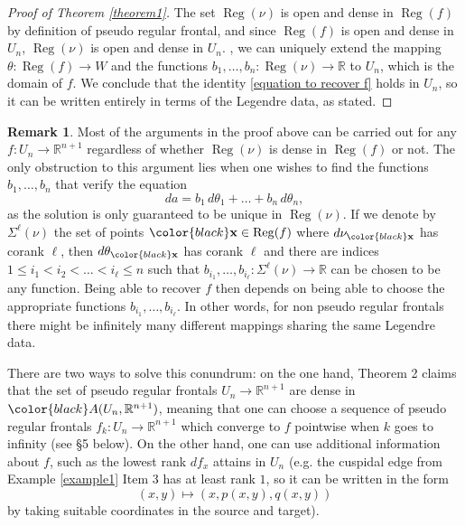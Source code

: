 \documentclass{amsart}
\theoremstyle{definition}
\theoremstyle{definition}
\theoremstyle{definition}
\newtheorem{remark}{Remark}
\newcommand{\mb}{\mathbb}
\DeclareMathOperator{\Reg}{Reg}
\newcommand{\ch}[1]{{\color{black} #1}}
\begin{document}
\begin{proof}[Proof of Theorem \ref{theorem1}]
	The set $\Reg(\nu)$ is \ch{open and} dense in $\Reg(f)$ by definition of pseudo regular frontal, and since $\Reg(f)$ is \ch{open and} dense in $U_n$, $\Reg(\nu)$ is \ch{open and} dense in $U_n$.
	, we can uniquely extend the mapping $\theta\colon \Reg(f) \to W$ and the functions $b_1,\dots,b_n\colon \Reg(\nu) \to \mb{R}$ to $U_n$, which is the domain of $f$.
	We conclude that the identity \eqref{equation to recover f} holds in $U_n$, so it can be written entirely in terms of the Legendre data, as stated.
\end{proof}

\begin{remark}
	Most of the arguments in the proof above can be carried out for any $f\colon U_n \to \mb{R}^{n+1}$ regardless of whether $\Reg(\nu)$ is dense in $\Reg(f)$ or not.
	The only obstruction to this argument lies when one wishes to find the functions $b_1,\dots,b_n$ that verify the equation
		\[da=b_1\,d\theta_1+\dots+b_n\,d\theta_n,\]
	as the solution is only guaranteed to be unique in $\Reg(\nu)$.
	If we denote by $\Sigma^\ell(\nu)$ 
	the set of points ${\color{black}\bf x}\in \Reg(f)$ 
	where $d\nu_{\color{black}\bf x}$ 
	has corank $\ell$, then $d\theta_{\color{black}\bf x}$ 
	has corank $\ell$ and there are indices $1 \leq i_1 < i_2 < \dots < i_\ell \leq n$ such that $b_{i_1}, \dots, b_{i_\ell}\colon \Sigma^\ell(\nu) \to \mb{R}$ can be chosen to be any function.
	 Being able to recover $f$ then depends on being able to choose the appropriate functions $b_{i_1}, \dots, b_{i_\ell}$. In other words, for non pseudo regular frontals there might be infinitely many different mappings sharing the same Legendre data.
	
	There are two ways to solve this conundrum: on the one hand, Theorem 2 claims that the set of pseudo regular frontals $U_n \to \mb{R}^{n+1}$ are dense in ${\color{black}A}(U_n,\mb{R}^{n+1})$, meaning that one can choose a sequence of pseudo regular frontals $f_k\colon U_n \to \mb{R}^{n+1}$ which converge to $f$ pointwise when $k$ goes to infinity (see \S 5 below).
	On the other hand, one can use additional information about $f$, such as the lowest rank $df_x$ attains in $U_n$ (e.g. the cuspidal edge from Example \ref{example1} Item 3 has at least rank $1$, so it can be written in the form
		\[(x,y) \mapsto (x,p(x,y),q(x,y))\]
	by taking suitable coordinates in the source and target).
\end{remark}


\end{document}
